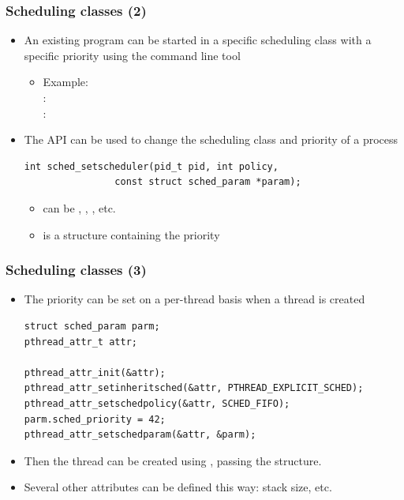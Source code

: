 \begin{frame}[fragile]
  \frametitle{Scheduling classes (2)}
  \begin{itemize}
  \item An existing program can be started in a specific scheduling
    class with a specific priority using the  command line tool
    \begin{itemize}
    \item Example:  \\
        : \\
	: 
    \end{itemize}
  \item The  API can be used to change the scheduling class
    and priority of a process
    \begin{block}{}
\begin{verbatim}
int sched_setscheduler(pid_t pid, int policy,
                const struct sched_param *param);
\end{verbatim}
    \end{block}{}
    \begin{itemize}
    \item {} can be , ,
      , etc.
    \item {} is a structure containing the priority
    \end{itemize}
  \end{itemize}
\end{frame}

\begin{frame}[fragile]
  \frametitle{Scheduling classes (3)}
  \begin{itemize}
  \item The priority can be set on a per-thread basis when a thread is
    created
    \begin{block}{}
\footnotesize
\begin{verbatim}
struct sched_param parm;
pthread_attr_t attr;

pthread_attr_init(&attr);
pthread_attr_setinheritsched(&attr, PTHREAD_EXPLICIT_SCHED);
pthread_attr_setschedpolicy(&attr, SCHED_FIFO);
parm.sched_priority = 42;
pthread_attr_setschedparam(&attr, &parm);
\end{verbatim}
\normalsize
    \end{block}
  \item Then the thread can be created using ,
    passing the  structure.
  \item Several other attributes can be defined this way: stack size,
    etc.
  \end{itemize}
\end{frame}

